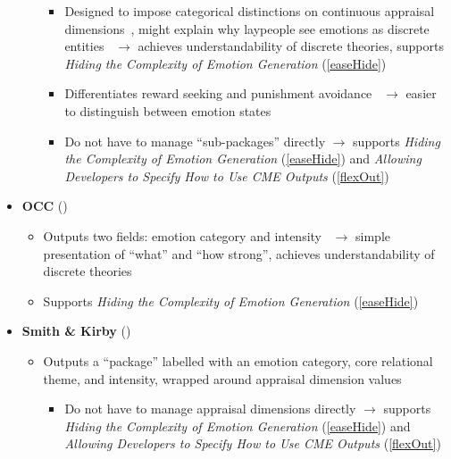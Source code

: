 \begin{itemize}
\begin{itemize}
\begin{itemize}
            \item Designed to impose categorical distinctions on continuous
            appraisal dimensions~\citep[p.~75, 80]{roseman2001model}, might
            explain why laypeople see emotions as discrete
            entities~\citep[p.~147]{roseman2013appraisal} $\rightarrow$ achieves
            understandability of discrete theories, supports \textit{Hiding the
                Complexity of Emotion Generation} (\ref{easeHide})

            \item Differentiates reward seeking and punishment
            avoidance~\citep[p.~910]{roseman1990appraisals} $\rightarrow$
            easier to distinguish between emotion states

            \item Do not have to manage ``sub-packages'' directly $\rightarrow$
            supports \textit{Hiding the Complexity of Emotion Generation}
            (\ref{easeHide}) and \textit{Allowing Developers to Specify How to
                Use CME Outputs} (\ref{flexOut})
        \end{itemize}
    \end{itemize}

    \item \textbf{OCC} (\good)
    \begin{itemize}
        \item Outputs two fields: emotion category and
        intensity~\citep[p.~183--184]{occ} $\rightarrow$ simple presentation of
        ``what'' and ``how strong'', achieves understandability of discrete
        theories

        \item Supports \textit{Hiding the Complexity of Emotion Generation}
        (\ref{easeHide})
    \end{itemize}

    \item \textbf{Smith \& Kirby} (\strong)
    \begin{itemize}
        \item Outputs a ``package'' labelled with an emotion category, core
        relational theme, and intensity, wrapped around appraisal dimension
        values~\citep[p.~123, 125]{smith2001toward}
        \begin{itemize}
            \item Do not have to manage appraisal dimensions directly
            $\rightarrow$ supports \textit{Hiding the Complexity of Emotion
                Generation} (\ref{easeHide}) and \textit{Allowing Developers to
                Specify How to Use CME Outputs} (\ref{flexOut})


\end{itemize}
\end{itemize}
\end{itemize}

